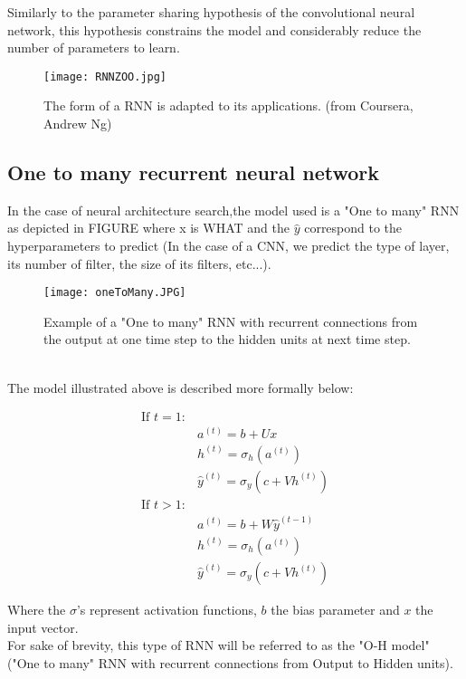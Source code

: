 \documentclass[11pt, onecolumn, a4paper]{report}
\begin{document}
Similarly to the parameter sharing hypothesis of the convolutional neural network, this hypothesis constrains the model and considerably reduce the number of parameters to learn.\\

\begin{figure}[H]
\texttt{[image: RNNZOO.jpg]}
\caption{The form of a RNN is adapted to its applications. (from Coursera, Andrew Ng)}
\end{figure}

\subsection{One to many recurrent neural network}

In the case of neural architecture search,the model used is a "One to many" RNN as depicted in FIGURE
where x is WHAT and the $\hat{y}$ correspond to the hyperparameters to predict (In the case of a CNN, we predict the type of layer, its number of filter, the size of its filters, etc...).

\begin{figure}[H]
\texttt{[image: oneToMany.JPG]}
\caption{Example of a "One to many" RNN with recurrent connections from the output at one time step to the hidden units at next time step.}
\end{figure}
\\
The model illustrated above is described more formally below:

\begin{align}
    \text{If }t=1:\\
    & a^{(t)} =b +Ux\\
        & h^{(t)} = \sigma_h(a^{(t)})\\
        &  \hat{y}^{(t)}= \sigma_y(c+Vh^{(t)})\\
    \text{If }t>1:\\
        & a^{(t)} =b + W\hat{y}^{(t-1)}\\
        & h^{(t)} = \sigma_h(a^{(t)})\\
        & \hat{y}^{(t)}= \sigma_y(c+Vh^{(t)})
\end{align}

Where the $\sigma$'s represent activation functions, $b$ the bias parameter and $x$ the input vector. \\
For sake of brevity, this type of RNN will be referred to as the "O-H model" ("One to many" RNN with recurrent connections from Output to Hidden units).
\end{document}
